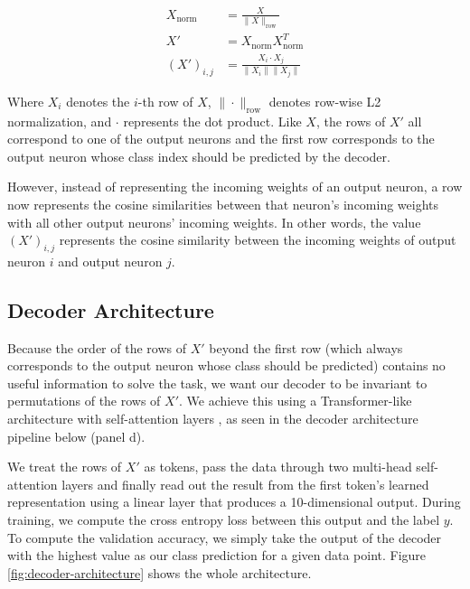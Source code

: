 \documentclass[11pt]{article}
\begin{document}
\begin{align}
X_{\text{norm}} &= \frac{X}{\|X\|_{\text{row}}} \\
X' &= X_{\text{norm}} X_{\text{norm}}^T \\
(X')_{i,j} &= \frac{X_i \cdot X_j}{\|X_i\| \|X_j\|}
\end{align}

Where $X_i$ denotes the $i$-th row of $X$, $\|\cdot\|_{\text{row}}$ denotes row-wise L2 normalization, and $\cdot$ represents the dot product. Like $X$, the rows of $X'$ all correspond to one of the output neurons and the first row corresponds to the output neuron whose class index should be predicted by the decoder.

However, instead of representing the incoming weights of an output neuron, a row now represents the cosine similarities between that neuron's incoming weights with all other output neurons' incoming weights. In other words, the value $(X')_{i,j}$ represents the cosine similarity between the incoming weights of output neuron $i$ and output neuron $j$.

\subsection{Decoder Architecture}

Because the order of the rows of $X'$ beyond the first row (which always corresponds to the output neuron whose class should be predicted) contains no useful information to solve the task, we want our decoder to be invariant to permutations of the rows of $X'$. We achieve this using a Transformer-like architecture with self-attention layers \cite{vaswani2017}, as seen in the decoder architecture pipeline below (panel d).

We treat the rows of $X'$ as tokens, pass the data through two multi-head self-attention layers and finally read out the result from the first token's learned representation using a linear layer that produces a 10-dimensional output. During training, we compute the cross entropy loss between this output and the label $y$. To compute the validation accuracy, we simply take the output of the decoder with the highest value as our class prediction for a given data point. Figure \ref{fig:decoder-architecture} shows the whole architecture.
\end{document}
